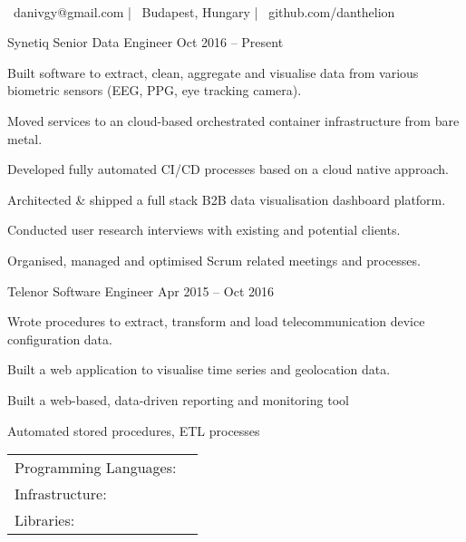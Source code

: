 \documentclass[]{awesome-cv}
\begin{document}
    
\begin{center}
	  \\
	\vspace{2mm}
	{\faEnvelope\ danivgy@gmail.com} | {\faMapMarker\ Budapest, Hungary} | {\faLink\ github.com/danthelion}
\end{center}
\begin{cventries}
	\cventry
	{Synetiq}
	{Senior Data Engineer}
	{Oct 2016 – Present}
	{}
	{\begin{cvitems}
		\item {Built software to extract, clean, aggregate and visualise data from various biometric sensors (EEG, PPG, eye tracking camera).}
		\item {Moved services to an cloud-based orchestrated container infrastructure from bare metal.}
		\item {Developed fully automated CI/CD processes based on a cloud native approach.}
		\item {Architected \& shipped a full stack B2B data visualisation dashboard platform.}
		\item {Conducted user research interviews with existing and potential clients.}
		\item {Organised, managed and optimised Scrum related meetings and processes.}
		\end{cvitems}}
	\cventry
	{Telenor}
	{Software Engineer}
	{Apr 2015 – Oct 2016}
	{}
	{\begin{cvitems}
		\item {Wrote procedures to extract, transform and load telecommunication device configuration data.}
		\item {Built a web application to visualise time series and geolocation data.}
		\item {Built a web-based, data-driven reporting and monitoring tool}
		\item {Automated stored procedures, ETL processes}
		\end{cvitems}}
\end{cventries}
\begin{cventries}
	\cventry
	{}
	{\def\arraystretch{1.15}{\begin{tabular}{ l l }
		Programming Languages:  & {\skill{ Python, SQL, JavaScript, Go, bash}} \\
		Infrastructure:  & {\skill{ Docker, Kubernetes, GNU/Linux,  PostgreSQL, Google Cloud Platform}} \\
		Libraries:  & {\skill{ pandas, Luigi, SQLAlchemy, Flask, Vue.js}} \\
		\end{tabular}}}
	{}
	{}
	{}
\end{cventries}
\end{document}
